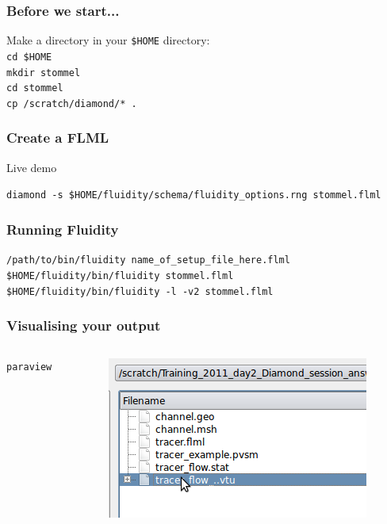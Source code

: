 \documentclass[12pt]{beamer}
\begin{document}
\begin{frame}
    \frametitle{Before we start...}

Make a directory in your \texttt{\$HOME} directory:\\
\texttt{cd \$HOME}
\\
\texttt{mkdir stommel}
\\
\texttt{cd stommel}
\\
\texttt{cp /scratch/diamond/* .}
\end{frame}


\begin{frame}
    \frametitle{Create a FLML}
Live demo

\texttt{diamond -s \$HOME/fluidity/schema/fluidity\_options.rng stommel.flml}
\end{frame}

\begin{frame}
    \frametitle{Running Fluidity}
\scriptsize{\texttt{/path/to/bin/fluidity name\_of\_setup\_file\_here.flml}}
\\
\scriptsize{\texttt{\$HOME/fluidity/bin/fluidity stommel.flml}}
\\
\scriptsize{\texttt{\$HOME/fluidity/bin/fluidity -l -v2 stommel.flml}}
\end{frame}


\begin{frame}
	\frametitle{Visualising your output}
\begin{columns}
\begin{column}{0.6\textwidth}

\texttt{paraview}
\end{column}
\begin{column}{0.4\textwidth}
\begin{center}
\includegraphics[width=\textwidth]{images/State_Open.png}
\end{center}
\end{column}
\end{columns}


\end{frame}
\end{document}
